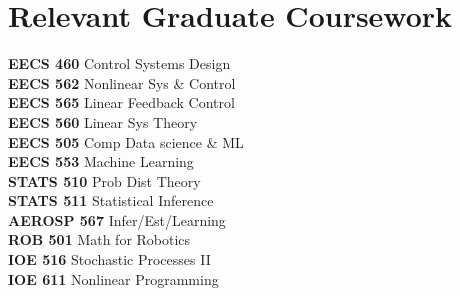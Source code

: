 \documentclass[letterpaper,11pt]{article}
\newcommand{\resumeSubHeadingListStart}{\begin{itemize}[leftmargin=0.15in, label={}]}
\newcommand{\resumeSubHeadingListEnd}{\end{itemize}}
\begin{document}
\section{Relevant Graduate Coursework}
\begin{multicols}{3}
 \begin{itemize}[leftmargin=0.15in, label={}]
    \small{\item{
    \textbf{EECS 460} {Control Systems Design}\\
     \textbf{EECS 562} {Nonlinear Sys \& Control}\\
     \textbf{EECS 565} {Linear Feedback Control}\\
     \textbf{EECS 560} {Linear Sys Theory}\\
     \textbf{EECS 505} {Comp Data science \& ML}\\
     \textbf{EECS 553} {Machine Learning}\\
     \textbf{STATS 510} {Prob Dist Theory}\\
     \textbf{STATS 511} {Statistical Inference}\\
     \textbf{AEROSP 567} {Infer/Est/Learning}\\
     \textbf{ROB 501} {Math for Robotics}\\
     \textbf{IOE 516} {Stochastic Processes II}\\
     \textbf{IOE 611} {Nonlinear Programming}\\
    }}
 \end{itemize}
 \end{multicols}
\end{document}
